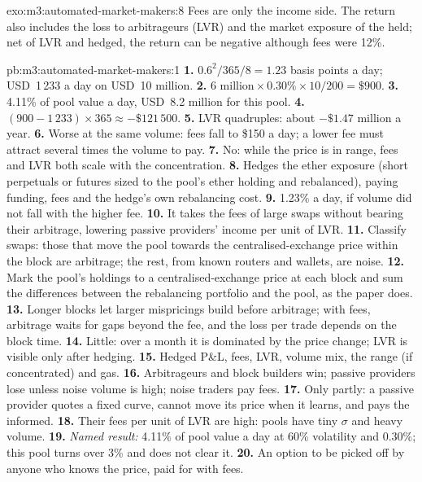 \begin{solution}{exo:m3:automated-market-makers:8}
Fees are only the income side. The return also includes the loss to arbitrageurs (LVR) and the market exposure of the  held;
net of LVR and hedged, the return can be negative although fees were 12\%.
\end{solution}

\begin{solution}{pb:m3:automated-market-makers:1}
\textbf{1.} $0.6^2/365/8 = 1.23$ basis points a day; USD~1\,233 a day on USD~10 million. \textbf{2.} $6\text{ million} \times 0.30\%
\times 10/200 = \$900$. \textbf{3.} 4.11\% of pool value a day, USD~8.2 million for this pool. \textbf{4.} $(900 - 1\,233) \times 365
\approx -\$121\,500$. \textbf{5.} LVR quadruples: about $-\$1.47$ million a year. \textbf{6.} Worse at the same volume: fees fall to
\$150 a day; a lower fee must attract several times the volume to pay. \textbf{7.} No: while the price is in range, fees and LVR both
scale with the concentration. \textbf{8.} Hedges the ether exposure (short perpetuals or futures sized to the pool's ether holding and
rebalanced), paying funding, fees and the hedge's own rebalancing cost. \textbf{9.} 1.23\% a day, if volume did not fall with the
higher fee. \textbf{10.} It takes the fees of large swaps without bearing their arbitrage, lowering passive providers' income per unit of
LVR. \textbf{11.} Classify swaps: those that move the pool towards the centralised-exchange price within the block are arbitrage; the
rest, from known routers and wallets, are noise. \textbf{12.} Mark the pool's holdings to a centralised-exchange price at each block and
sum the differences between the rebalancing portfolio and the pool, as the paper does. \textbf{13.} Longer blocks let larger mispricings
build before arbitrage; with fees, arbitrage waits for gaps beyond the fee, and the loss per trade depends on the block time.
\textbf{14.} Little: over a month it is dominated by the price change; LVR is visible only after hedging. \textbf{15.} Hedged P\&L, fees,
LVR, volume mix, the range (if concentrated) and gas. \textbf{16.} Arbitrageurs and block builders win; passive providers lose unless
noise volume is high; noise traders pay fees. \textbf{17.} Only partly: a passive provider quotes a fixed curve, cannot move its price
when it learns, and pays the informed. \textbf{18.} Their fees per unit of LVR are high:  pools have tiny $\sigma$ and heavy
volume. \textbf{19.} \emph{Named result:} 4.11\% of pool value a day at 60\% volatility and 0.30\%; this pool turns over 3\% and does not
clear it. \textbf{20.} An option to be picked off by anyone who knows the price, paid for with fees.
\end{solution}

